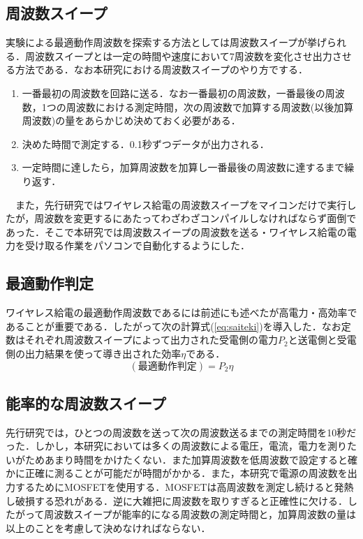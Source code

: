 \documentclass[10pt,a4paper,twocolumn]{jarticle}
\begin{document}
\subsection{周波数スイープ}
実験による最適動作周波数を探索する方法としては周波数スイープが挙げられる．周波数スイープとは一定の時間や速度において7周波数を変化させ出力させる方法である．なお本研究における周波数スイープのやり方でする．
\begin{enumerate}
	\item  一番最初の周波数を回路に送る．なお一番最初の周波数，一番最後の周波数，1つの周波数における測定時間，次の周波数で加算する周波数(以後加算周波数)の量をあらかじめ決めておく必要がある．
	\item 決めた時間で測定する．0.1秒ずつデータが出力される．
	\item 一定時間に達したら，加算周波数を加算し一番最後の周波数に達するまで繰り返す．
\end{enumerate}
　また，先行研究ではワイヤレス給電の周波数スイープをマイコンだけで実行したが，周波数を変更するにあたってわざわざコンパイルしなければならず面倒であった．そこで本研究では周波数スイープの周波数を送る・ワイヤレス給電の電力を受け取る作業をパソコンで自動化するようにした．
\subsection{最適動作判定}
ワイヤレス給電の最適動作周波数であるには前述にも述べたが高電力・高効率であることが重要である．したがって次の計算式(\ref{eq:saiteki})を導入した．なお定数はそれぞれ周波数スイープによって出力された受電側の電力$P_2$と送電側と受電側の出力結果を使って導き出された$効率\eta$である．
\begin{equation}
(最適動作判定)=P_2\eta
\label{eq:saiteki}
\end{equation}
\subsection{能率的な周波数スイープ}
先行研究では，ひとつの周波数を送って次の周波数送るまでの測定時間を10秒だった．しかし，本研究においては多くの周波数による電圧，電流，電力を測りたいがためあまり時間をかけたくない．また加算周波数を低周波数で設定すると確かに正確に測ることが可能だが時間がかかる．また，本研究で電源の周波数を出力するためにMOSFETを使用する．MOSFETは高周波数を測定し続けると発熱し破損する恐れがある．逆に大雑把に周波数を取りすぎると正確性に欠ける．したがって周波数スイープが能率的になる周波数の測定時間と，加算周波数の量は以上のことを考慮して決めなければならない．
\end{document}
